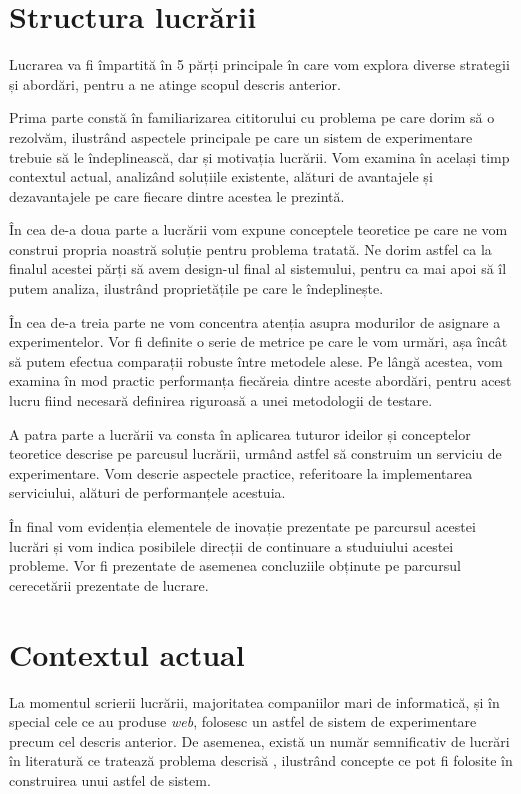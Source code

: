 \section{Structura lucrării}

Lucrarea va fi împartită în 5 părți principale în care vom explora diverse strategii și abordări, pentru a ne atinge scopul descris anterior. 

Prima parte constă în familiarizarea cititorului cu problema pe care dorim să o rezolvăm, ilustrând aspectele principale pe care un sistem de experimentare trebuie să le îndeplinească, dar și motivația lucrării. Vom examina în același timp contextul actual, analizând soluțiile existente, alături de avantajele și dezavantajele pe care fiecare dintre acestea le prezintă.

În cea de-a doua parte a lucrării vom expune conceptele teoretice pe care ne vom construi propria noastră soluție pentru problema tratată.  Ne dorim astfel ca la finalul acestei părți să avem design-ul final al sistemului, pentru ca mai apoi să îl putem analiza, ilustrând proprietățile pe care le îndeplinește.

În cea de-a treia parte ne vom concentra atenția asupra modurilor de asignare a experimentelor. Vor fi definite o serie de metrice pe care le vom urmări, așa încât să putem efectua comparații robuste între metodele alese. Pe lângă acestea, vom examina în mod practic performanța fiecăreia dintre aceste abordări, pentru acest lucru fiind necesară definirea riguroasă a unei metodologii de testare.

A patra parte a lucrării va consta în aplicarea tuturor ideilor și conceptelor teoretice descrise pe parcusul lucrării, urmând astfel să construim un serviciu de experimentare. Vom descrie aspectele practice, referitoare la implementarea serviciului, alături de performanțele acestuia.

În final vom evidenția elementele de inovație prezentate pe parcursul acestei lucrări și vom indica posibilele direcții de continuare a studuiului acestei probleme. Vor fi prezentate de asemenea concluziile obținute pe parcursul cerecetării prezentate de lucrare.

\section{Contextul actual}

La momentul scrierii lucrării, majoritatea companiilor mari de informatică, și în special cele ce au produse \textit{web}, folosesc un astfel de sistem de experimentare precum cel descris anterior. De asemenea,  există un număr semnificativ de lucrări în literatură ce tratează problema descrisă \cite{overlapgoogle} \cite{multiarmeconomy}, ilustrând concepte ce pot fi folosite în construirea unui astfel de sistem. 

